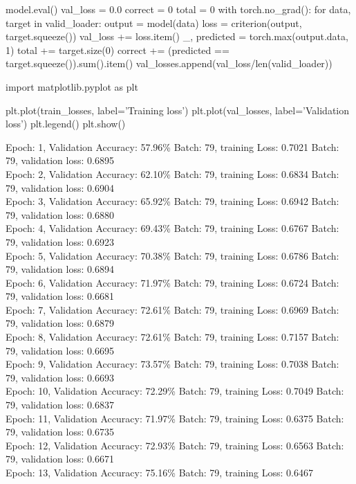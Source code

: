 \documentclass[11pt]{article}
\begin{document}
\begin{python}
    model.eval()
    val_loss = 0.0
    correct = 0
    total = 0
    with torch.no_grad():
        for data, target in valid_loader:
            output = model(data)
            loss = criterion(output, target.squeeze())
            val_loss += loss.item()
            _, predicted = torch.max(output.data, 1)
            total += target.size(0)
            correct += (predicted == target.squeeze()).sum().item()
        val_losses.append(val_loss/len(valid_loader))   

import matplotlib.pyplot as plt

plt.plot(train_losses, label='Training loss')
plt.plot(val_losses, label='Validation loss')
plt.legend()
plt.show()
\end{python}
Epoch: 1, Validation Accuracy: 57.96\%
Batch: 79, training Loss: 0.7021
Batch: 79, validation loss: 0.6895\\
Epoch: 2, Validation Accuracy: 62.10\%
Batch: 79, training Loss: 0.6834
Batch: 79, validation loss: 0.6904\\
Epoch: 3, Validation Accuracy: 65.92\%
Batch: 79, training Loss: 0.6942
Batch: 79, validation loss: 0.6880\\
Epoch: 4, Validation Accuracy: 69.43\%
Batch: 79, training Loss: 0.6767
Batch: 79, validation loss: 0.6923\\
Epoch: 5, Validation Accuracy: 70.38\%
Batch: 79, training Loss: 0.6786
Batch: 79, validation loss: 0.6894\\
Epoch: 6, Validation Accuracy: 71.97\%
Batch: 79, training Loss: 0.6724
Batch: 79, validation loss: 0.6681\\
Epoch: 7, Validation Accuracy: 72.61\%
Batch: 79, training Loss: 0.6969
Batch: 79, validation loss: 0.6879\\
Epoch: 8, Validation Accuracy: 72.61\%
Batch: 79, training Loss: 0.7157
Batch: 79, validation loss: 0.6695\\
Epoch: 9, Validation Accuracy: 73.57\%
Batch: 79, training Loss: 0.7038
Batch: 79, validation loss: 0.6693\\
Epoch: 10, Validation Accuracy: 72.29\%
Batch: 79, training Loss: 0.7049
Batch: 79, validation loss: 0.6837\\
Epoch: 11, Validation Accuracy: 71.97\%
Batch: 79, training Loss: 0.6375
Batch: 79, validation loss: 0.6735\\
Epoch: 12, Validation Accuracy: 72.93\%
Batch: 79, training Loss: 0.6563
Batch: 79, validation loss: 0.6671\\
Epoch: 13, Validation Accuracy: 75.16\%
Batch: 79, training Loss: 0.6467
\end{document}
